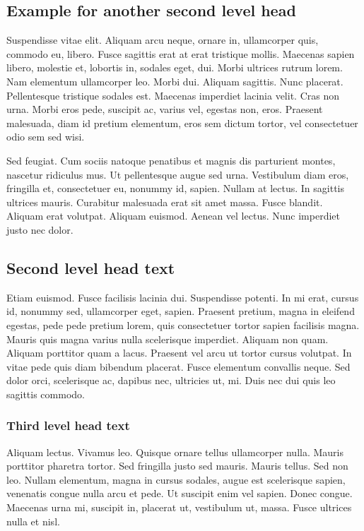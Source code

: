 \documentclass[AMA,STIX1COL]{WileyNJD-SP}
\begin{document}
\subsection{Example for another second level head}

Suspendisse vitae elit. Aliquam arcu neque, ornare in, ullamcorper quis, commodo eu, libero. Fusce sagittis erat at
erat tristique mollis. Maecenas sapien libero, molestie et, lobortis in, sodales eget, dui. Morbi ultrices rutrum lorem.
Nam elementum ullamcorper leo. Morbi dui. Aliquam sagittis. Nunc placerat. Pellentesque tristique sodales est.
Maecenas imperdiet lacinia velit. Cras non urna. Morbi eros pede, suscipit ac, varius vel, egestas non, eros. Praesent
malesuada, diam id pretium elementum, eros sem dictum tortor, vel consectetuer odio sem sed wisi.

Sed feugiat. Cum sociis natoque penatibus et magnis dis parturient montes, nascetur ridiculus mus. Ut pellentesque
augue sed urna. Vestibulum diam eros, fringilla et, consectetuer eu, nonummy id, sapien. Nullam at lectus. In sagittis
ultrices mauris. Curabitur malesuada erat sit amet massa. Fusce blandit. Aliquam erat volutpat. Aliquam euismod.
Aenean vel lectus. Nunc imperdiet justo nec dolor.

\subsection{Second level head text}

Etiam euismod. Fusce facilisis lacinia dui. Suspendisse potenti. In mi erat, cursus id, nonummy sed, ullamcorper
eget, sapien. Praesent pretium, magna in eleifend egestas, pede pede pretium lorem, quis consectetuer tortor sapien
facilisis magna. Mauris quis magna varius nulla scelerisque imperdiet. Aliquam non quam. Aliquam porttitor quam
a lacus. Praesent vel arcu ut tortor cursus volutpat. In vitae pede quis diam bibendum placerat. Fusce elementum
convallis neque. Sed dolor orci, scelerisque ac, dapibus nec, ultricies ut, mi. Duis nec dui quis leo sagittis commodo.


\subsubsection{Third level head text}

Aliquam lectus. Vivamus leo. Quisque ornare tellus ullamcorper nulla. Mauris porttitor pharetra tortor. Sed fringilla
justo sed mauris. Mauris tellus. Sed non leo. Nullam elementum, magna in cursus sodales, augue est scelerisque
sapien, venenatis congue nulla arcu et pede. Ut suscipit enim vel sapien. Donec congue. Maecenas urna mi, suscipit
in, placerat ut, vestibulum ut, massa. Fusce ultrices nulla et nisl.
\end{document}
